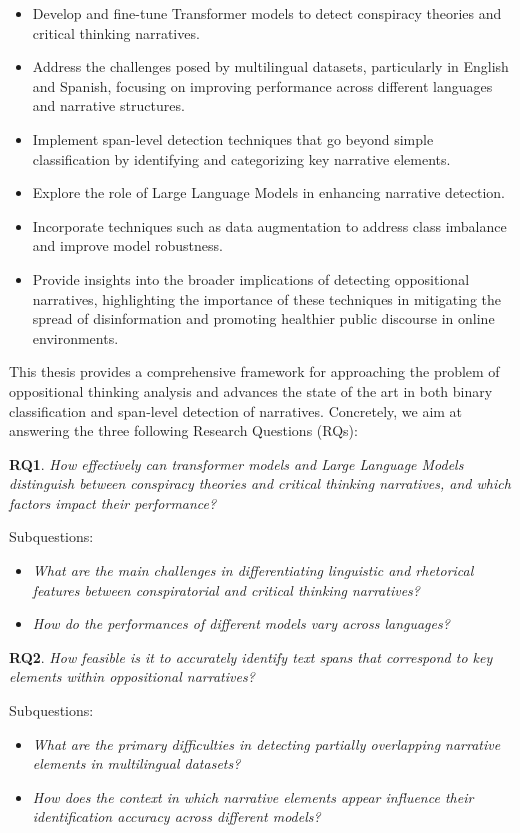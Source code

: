 \documentclass{Configuration_Files/PoliMi3i_thesis}
\begin{document}
\begin{itemize}
    \item Develop and fine-tune Transformer models to detect conspiracy theories and critical thinking narratives.
    \item Address the challenges posed by multilingual datasets, particularly in English and Spanish, focusing on improving performance across different languages and narrative structures.
    \item Implement span-level detection techniques that go beyond simple classification by identifying and categorizing key narrative elements.
    \item Explore the role of Large Language Models in enhancing narrative detection. 
    \item Incorporate techniques such as data augmentation to address class imbalance and improve model robustness.
    \item Provide insights into the broader implications of detecting oppositional narratives, highlighting the importance of these techniques in mitigating the spread of disinformation and promoting healthier public discourse in online environments.
\end{itemize}

This thesis provides a comprehensive framework for approaching the problem of oppositional thinking analysis and advances the state of the art in both binary classification and span-level detection of narratives. Concretely, we aim at answering the three following Research Questions (RQs):

\textbf{RQ1}. \textit{How effectively can transformer models and Large Language Models distinguish between conspiracy theories and critical thinking narratives, and which factors impact their performance?}

Subquestions:
\begin{itemize}
    \item \textit{What are the main challenges in differentiating linguistic and rhetorical features between conspiratorial and critical thinking narratives?}
    \item \textit{How do the performances of different models vary across languages?}
\end{itemize}
     
\textbf{RQ2}. \textit{How feasible is it to accurately identify text spans that correspond to key elements within oppositional narratives?}

Subquestions:
\begin{itemize}
\item \textit{What are the primary difficulties in detecting partially overlapping narrative elements in multilingual datasets?}
\item \textit{How does the context in which narrative elements appear influence their identification accuracy across different models?} 
\end{itemize}
\end{document}
